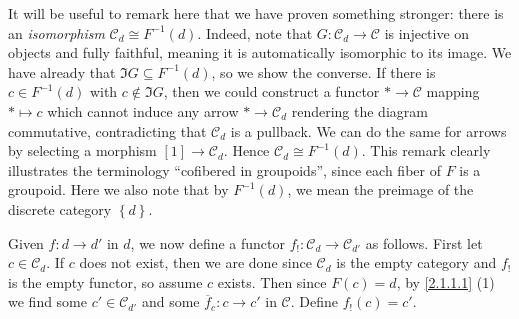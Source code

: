\begin{remark}\label{2.1.1.2}	
It will be useful to remark here that we have proven something stronger: there is an \emph{isomorphism} $\mathcal{C} _d \cong F^{-1} (d)$. Indeed, note that $G : \mathcal{C} _d \to \mathcal{C} $ is injective on objects and fully faithful, meaning it is automatically isomorphic to its image. We have already that $\Im G \subseteq F^{-1} (d)$, so we show the converse. If there is $c\in F^{-1} (d)$ with $c\notin \Im G$, then we could construct a functor $*\to  \mathcal{C} $ mapping $*\mapsto c$ which cannot induce any arrow $*\to \mathcal{C} _d$ rendering the diagram commutative, contradicting that $\mathcal{C} _d$ is a pullback. We can do the same for arrows by selecting a morphism $[1]\to \mathcal{C} _d$. Hence $\mathcal{C} _d \cong F^{-1} (d)$. This remark clearly illustrates the terminology ``cofibered in groupoids'', since each fiber of $F$ is a groupoid. Here we also note that by $F^{-1} (d)$, we mean the preimage of the discrete category $\left\{ d \right\} $.
\end{remark}

Given $f : d \to d'$ in $d$, we now define a functor $f_!: \mathcal{C} _d \to \mathcal{C} _{d'} $ as follows. First let $c\in \mathcal{C} _d$. If $c$ does not exist, then we are done since $\mathcal{C} _d$ is the empty category and $f_!$ is the empty functor, so assume $c$ exists. Then since $F(c)=d$, by \cref{2.1.1.1} (1) we find some $c'\in \mathcal{C}_{d'}$ and some $\overline{f}_c : c \to c'$ in $\mathcal{C} $. Define $f_!(c)=c'$.

